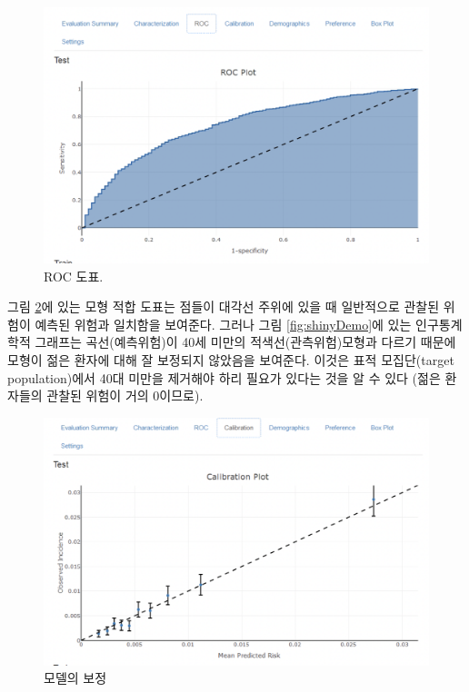 \documentclass[11pt]{book}
\theoremstyle{definition}
\theoremstyle{definition}
\theoremstyle{definition}
\theoremstyle{remark}
\begin{document}
\begin{figure}

{\centering \includegraphics[width=1\linewidth]{images/PatientLevelPrediction/shiny/singleShiny/singleShinyRoc} 

}

\caption{ROC 도표.}\label{fig:shinyROC}
\end{figure}

그림 \ref{fig:shinyCal}에 있는 모형 적합 도표는 점들이 대각선 주위에
있을 때 일반적으로 관찰된 위험이 예측된 위험과 일치함을 보여준다. 그러나
그림 \ref{fig:shinyDemo}에 있는 인구통계학적 그래프는 곡선(예측위험)이
40세 미만의 적색선(관측위험)모형과 다르기 때문에 모형이 젊은 환자에 대해
잘 보정되지 않았음을 보여준다. 이것은 표적 모집단(target population)에서
40대 미만을 제거해야 하리 필요가 있다는 것을 알 수 있다 (젊은 환자들의
관찰된 위험이 거의 0이므로).

\begin{figure}

{\centering \includegraphics[width=1\linewidth]{images/PatientLevelPrediction/shiny/singleShiny/singleShinyCal} 

}

\caption{모델의 보정}\label{fig:shinyCal}
\end{figure}
\end{document}
